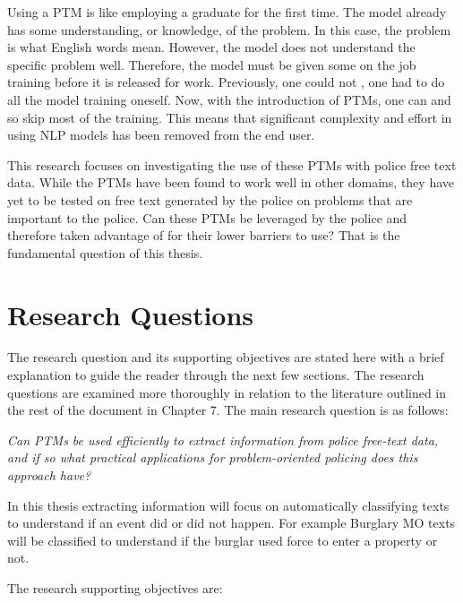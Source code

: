 Using a PTM is like employing a graduate for the first time. The model already has some understanding, or knowledge, of the problem. In this case, the problem is what English words mean. However, the model does not understand the specific problem well. Therefore, the model must be given some on the job training before it is released for work. Previously, one could not , one had to do all the model training oneself. Now, with the introduction of PTMs, one can  and so skip most of the training.  This means that significant complexity and effort in using NLP models has been removed from the end user.

This research focuses on investigating the use of these PTMs with police free text data. While the PTMs have been found to work well in other domains, they have yet to be tested on free text generated by the police on problems that are important to the police. Can these PTMs be leveraged by the police and therefore taken advantage of for their lower barriers to use? That is the fundamental question of this thesis.


\section{Research Questions}

The research question and its supporting objectives are stated here with a brief explanation to guide the reader through the next few sections. The research questions are examined more thoroughly in relation to the literature outlined in the rest of the document in Chapter 7. The main research question is as follows:


\emph{Can PTMs be used efficiently to extract information from police free-text data, and if so what practical applications for problem-oriented policing does this approach have?}


In this thesis extracting information will focus on automatically classifying texts to understand if an event did or did not happen. For example Burglary MO texts will be classified to understand if the burglar used force to enter a property or not.

The research supporting objectives are:

